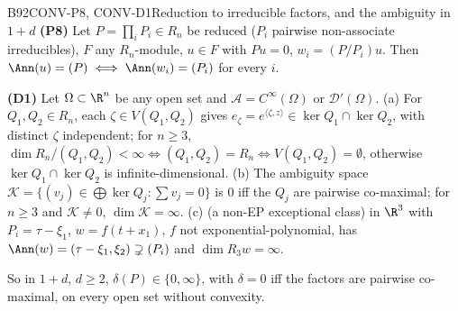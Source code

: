 \begin{dimcard}{B92}{CONV-P8, CONV-D1}{Reduction to irreducible factors, and the ambiguity in $1+d$}{\proved}{}
\textbf{(P8)} Let $P=\prod_iP_i\in R_n$ be reduced ($P_i$ pairwise non-associate irreducibles), $F$ any $R_n$-module, $u\in F$ with $Pu=0$, $w_i=(P/P_i)u$. Then $\Ann(u)=(P)\iff\Ann(w_i)=(P_i)$ for every $i$.

\textbf{(D1)} Let $\Omega\subset\R^n$ be any open set and $\mathcal A=C^\infty(\Omega)$ or $\mathcal D'(\Omega)$. (a) For $Q_1,Q_2\in R_n$, each $\zeta\in V(Q_1,Q_2)$ gives $e_\zeta=e^{\langle\zeta,z\rangle}\in\ker Q_1\cap\ker Q_2$, with distinct $\zeta$ independent; for $n\ge3$, $\dim R_n/(Q_1,Q_2)<\infty\iff(Q_1,Q_2)=R_n\iff V(Q_1,Q_2)=\emptyset$, otherwise $\ker Q_1\cap\ker Q_2$ is infinite-dimensional. (b) The ambiguity space $\mathcal K=\{(v_j)\in\bigoplus\ker Q_j:\sum v_j=0\}$ is $0$ iff the $Q_j$ are pairwise co-maximal; for $n\ge3$ and $\mathcal K\ne0$, $\dim\mathcal K=\infty$. (c) (a non-EP exceptional class) in $\R^3$ with $P_i=\tau-\xi_1$, $w=f(t+x_1)$, $f$ not exponential-polynomial, has $\Ann(w)=(\tau-\xi_1,\xi_2)\supsetneq(P_i)$ and $\dim R_3w=\infty$.

So in $1+d$, $d\ge2$, $\delta(P)\in\{0,\infty\}$, with $\delta=0$ iff the factors are pairwise co-maximal, on every open set without convexity.
\end{dimcard}

